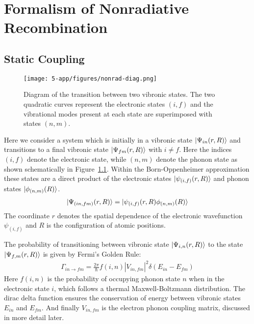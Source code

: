\def\vhq{\frac{\partial h}{\partial Q}}

\chapter{Formalism of Nonradiative Recombination}

\section{Static Coupling}

\begin{figure}[H]
    \centering
    \texttt{[image: 5-app/figures/nonrad-diag.png]}
    \caption{Diagram of the transition between two vibronic states. The two quadratic curves represent the electronic states $(i,f)$ and the vibrational modes present at each state are superimposed with states $(n,m)$.}
    \label{app:fig:nonrad}
\end{figure}


Here we consider a system which is initially in a vibronic state $\ket{\Psi_{in}(r,R)}$ and transitions to a final vibronic state $\ket{\Psi_{fm}(r,R)}$ with $i\neq f$. Here the indices $(i,f)$ denote the electronic state, while $(n,m)$ denote the phonon state as shown schematically in Figure~\ref{app:fig:nonrad}. Within the Born-Oppenheimer approximation these states are a direct product of the electronic states $\ket{\psi_{(i,f)}(r,R)}$ and phonon states $\ket{\phi_{(n,m)}(R)}$.
\begin{align}
    \ket{\Psi_{(in,fm)}(r,R)}=\ket{\psi_{(i,f)}(r,R)\phi_{(n,m)}(R)}   \label{app:nonrad:eq:vib}
\end{align}
The coordinate $r$ denotes the spatial dependence of the electronic wavefunction $\psi_{(i,f)}$ and $R$ is the configuration of atomic positions.

The probability of transitioning between vibronic state $\ket{\Psi_{i,n}(r,R)}$ to the state $\ket{\Psi_{f,m}(r,R)}$ is given by Fermi's Golden Rule:
\begin{align}
    \Gamma_{in\rightarrow fm} = \frac{2\pi}{\hbar} f(i,n) |V_{in,fm}|^2 \delta(E_{in}-E_{fm})
    \label{app:nonrad:eq:g1}
\end{align}
Here $f(i,n)$ is the probability of occupying phonon state $n$ when in the electronic state $i$, which follows a thermal Maxwell-Boltzmann distribution. The dirac delta function ensures the conservation of energy between vibronic states $E_{in}$ and $E_{fm}$. And finally $V_{in,fm}$ is the electron phonon coupling matrix, discussed in more detail later.

